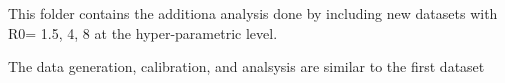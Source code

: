 This folder contains the additiona analysis done by including new datasets with R0= 1.5, 4, 8 at the hyper-parametric level. 

The data generation, calibration, and analsysis are similar to the first dataset

